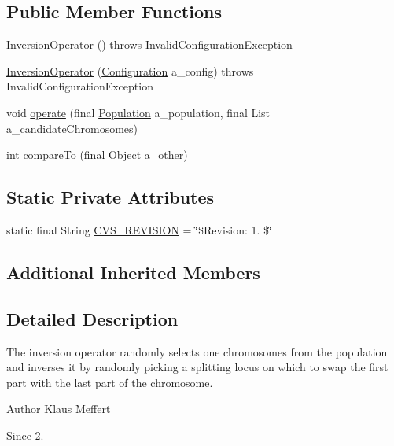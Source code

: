 \subsection*{Public Member Functions}
\begin{DoxyCompactItemize}
\item 
\hyperlink{classorg_1_1jgap_1_1impl_1_1_inversion_operator_a7a50c648fa4d8f3520daac4181000492}{Inversion\-Operator} ()  throws Invalid\-Configuration\-Exception 
\item 
\hyperlink{classorg_1_1jgap_1_1impl_1_1_inversion_operator_ab041d9c13cd9be6253688faf521f82e7}{Inversion\-Operator} (\hyperlink{classorg_1_1jgap_1_1_configuration}{Configuration} a\-\_\-config)  throws Invalid\-Configuration\-Exception 
\item 
void \hyperlink{classorg_1_1jgap_1_1impl_1_1_inversion_operator_a7947681b60c19a585b1e0ee4595f625b}{operate} (final \hyperlink{classorg_1_1jgap_1_1_population}{Population} a\-\_\-population, final List a\-\_\-candidate\-Chromosomes)
\item 
int \hyperlink{classorg_1_1jgap_1_1impl_1_1_inversion_operator_aa1d02da79918063917b308ed77feef96}{compare\-To} (final Object a\-\_\-other)
\end{DoxyCompactItemize}
\subsection*{Static Private Attributes}
\begin{DoxyCompactItemize}
\item 
static final String \hyperlink{classorg_1_1jgap_1_1impl_1_1_inversion_operator_aca94aa84453c49f1e60df6f95453ecd9}{C\-V\-S\-\_\-\-R\-E\-V\-I\-S\-I\-O\-N} = \char`\"{}\$Revision\-: 1. \$\char`\"{}
\end{DoxyCompactItemize}
\subsection*{Additional Inherited Members}


\subsection{Detailed Description}
The inversion operator randomly selects one chromosomes from the population and inverses it by randomly picking a splitting locus on which to swap the first part with the last part of the chromosome.

\begin{DoxyAuthor}{Author}
Klaus Meffert 
\end{DoxyAuthor}
\begin{DoxySince}{Since}
2. 
\end{DoxySince}


